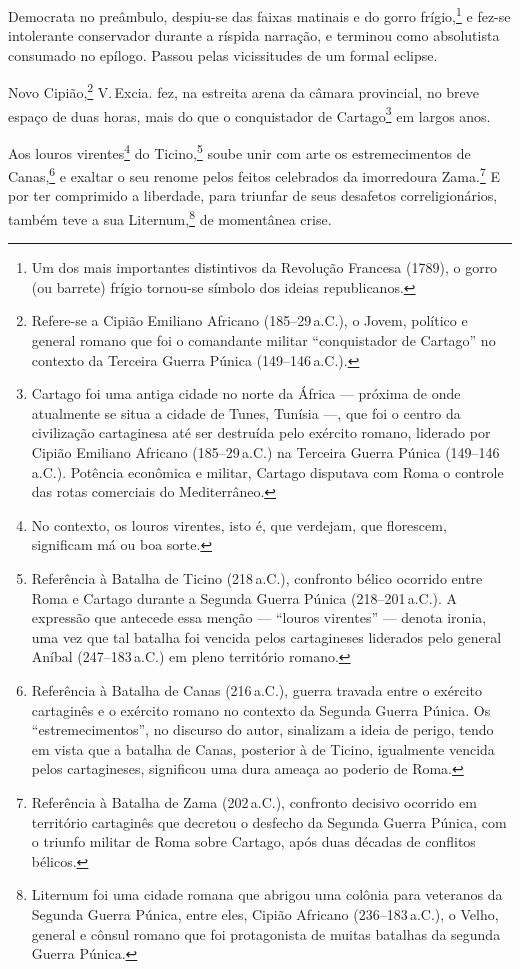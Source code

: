 Democrata no preâmbulo, despiu-se das faixas matinais e do gorro
frígio,\footnote{Um dos mais importantes distintivos da Revolução
  Francesa (1789), o gorro (ou barrete) frígio tornou-se símbolo dos
  ideias republicanos.\label{gorro}} e fez-se intolerante conservador durante a
ríspida narração, e terminou como absolutista consumado no epílogo.
Passou pelas vicissitudes de um formal eclipse.

Novo Cipião,\footnote{Refere-se a Cipião Emiliano Africano (185--29\,a.C.), 
o Jovem, político e general romano que foi o comandante militar
  ``conquistador de Cartago'' no contexto da Terceira Guerra Púnica
  (149--146\,a.C.).} V.\,Excia. fez, na estreita arena da câmara
provincial, no breve espaço de duas horas, mais do que o conquistador de
Cartago\footnote{Cartago foi uma antiga cidade no norte da África ---
  próxima de onde atualmente se situa a cidade de Tunes, Tunísia ---, que
  foi o centro da civilização cartaginesa até ser destruída pelo
  exército romano, liderado por Cipião Emiliano Africano (185--29\,a.C.) na
  Terceira Guerra Púnica (149--146\,a.C.). Potência econômica e militar,
  Cartago disputava com Roma o controle das rotas comerciais do
  Mediterrâneo.} em largos anos.

Aos louros virentes\footnote{No contexto, os louros virentes, isto é,
  que verdejam, que florescem, significam má ou boa sorte.} do
Ticino,\footnote{Referência à Batalha de Ticino (218\,a.C.), confronto
  bélico ocorrido entre Roma e Cartago durante a Segunda Guerra Púnica
  (218--201\,a.C.). A expressão que antecede essa menção --- ``louros
  virentes'' --- denota ironia, uma vez que tal batalha foi vencida pelos
  cartagineses liderados pelo general Aníbal (247--183\,a.C.) em
  pleno território romano.} soube unir com arte os estremecimentos de
Canas,\footnote{Referência à Batalha de Canas (216\,a.C.),
  guerra travada entre o exército cartaginês e o exército romano no
  contexto da Segunda Guerra Púnica. Os ``estremecimentos'',
  no discurso do autor, sinalizam a ideia de perigo, tendo em vista que
  a batalha de Canas, posterior à de Ticino, igualmente vencida pelos
  cartagineses, significou uma dura ameaça ao poderio de Roma.} e
exaltar o seu renome pelos feitos celebrados da imorredoura
Zama.\footnote{Referência à Batalha de Zama (202\,a.C.), confronto
  decisivo ocorrido em território cartaginês que decretou o desfecho da
  Segunda Guerra Púnica, com o triunfo militar de Roma
  sobre Cartago, após duas décadas de conflitos bélicos.} E por ter
comprimido a liberdade, para triunfar de seus desafetos
correligionários, também teve a sua Liternum,\footnote{Liternum foi uma
  cidade romana que abrigou uma colônia para veteranos da Segunda Guerra
  Púnica, entre eles, Cipião Africano (236--183\,a.C.), o
  Velho, general e cônsul romano que foi protagonista de muitas batalhas
  da segunda Guerra Púnica.} de momentânea crise.

